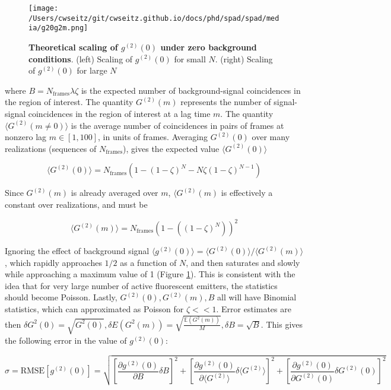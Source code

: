 \begin{figure}[t]
\centering
\texttt{[image: /Users/cwseitz/git/cwseitz.github.io/docs/phd/spad/spad/media/g20g2m.png]}
\caption{\textbf{Theoretical scaling of $g^{(2)}(0)$ under zero background conditions}. (left) Scaling of $g^{(2)}(0)$ for small $N$. (right) Scaling of $g^{(2)}(0)$ for large $N$}
\label{fig:fig8}
\end{figure}   

where $B = N_{\mathrm{frames}}\lambda\zeta$ is the expected number of background-signal coincidences in the region of interest. The quantity $G^{(2)}(m)$ represents the number of signal-signal coincidences in the region of interest at a lag time $m$. The quantity $\langle G^{(2)}(m\neq 0)\rangle$ is the average number of coincidences in pairs of frames at nonzero lag $m \in [1,100]$, in units of frames. Averaging $G^{(2)}(0)$ over many realizations (sequences of $N_{\mathrm{frames}}$), gives the expected value $\langle G^{(2)}(0)\rangle $

\begin{equation}
\langle G^{(2)}(0)\rangle = N_{\mathrm{frames}}(1 - (1-\zeta)^N - N\zeta (1-\zeta)^{N-1})
\end{equation}

Since $G^{(2)}(m)$ is already averaged over $m$, $\langle G^{(2)}(m) $ is effectively a constant over realizations, and must be

\begin{equation}
\langle G^{(2)}(m)\rangle =  N_{\mathrm{frames}} \left(1 - \left((1-\zeta)^N\right)\right)^2
\end{equation}

Ignoring the effect of background signal $\langle g^{(2)}(0)\rangle =\langle G^{(2)}(0)\rangle/\langle G^{(2)}(m)\rangle$, which rapidly approaches $1/2$ as a function of $N$, and then saturates and slowly while approaching a maximum value of 1 (Figure \ref{fig:fig8}). This is consistent with the idea that for very large number of active fluorescent emitters, the statistics should become Poisson. Lastly, $G^{(2)}(0),G^{(2)}(m),B$ all will have Binomial statistics, which can approximated as Poisson for $\zeta << 1$. Error estimates are then $\delta G^2(0) = \sqrt{G^2(0)}, \delta E(G^2(m)) = \sqrt{\frac{\mathbb{E}(G^2(m))}{M}}, \delta B = \sqrt{B}$. This gives the following error in the value of $g^{(2)}(0)$:

\begin{equation}
\sigma = \text{RMSE}[g^{(2)}(0)] = \sqrt{
    \left[
    \frac{\partial g^{(2)}(0)}{\partial B} \delta B
    \right]^2 +
    \left[
    \frac{\partial g^{(2)}(0)}{\partial \langle G^{(2)} \rangle} \delta \langle G^{(2)} \rangle
    \right]^2 +
    \left[
    \frac{\partial g^{(2)}(0)}{\partial G^{(2)}(0)} \delta G^{(2)}(0)
    \right]^2
}
\end{equation}

